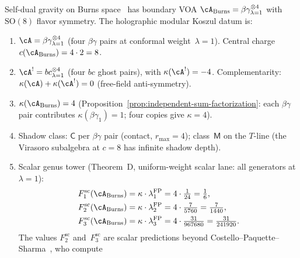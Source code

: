 \begin{computation}

\label{comp:burns-space-holographic-datum}
Self-dual gravity on Burns space~\cite{CPS2208,CPS2306} has boundary
VOA $\cA_{\mathrm{Burns}} = \beta\gamma^{\otimes 4}_{\lambda=1}$
with $\mathrm{SO}(8)$ flavor symmetry.
The holographic modular Koszul datum is:
\begin{enumerate}[label=\textup{(\roman*)}]
\item $\cA = \beta\gamma^{\otimes 4}_{\lambda=1}$
 \textup{(}four $\beta\gamma$ pairs at conformal
 weight~$\lambda = 1$\textup{)}.
 Central charge
 $c(\cA_{\mathrm{Burns}}) = 4 \cdot 2 = 8$.
\item $\cA^! = bc^{\otimes 4}_{\lambda=1}$
 \textup{(}four $bc$ ghost pairs\textup{)},
 with $\kappa(\cA^!) = -4$.
 Complementarity:
 $\kappa(\cA) + \kappa(\cA^!) = 0$
 \textup{(}free-field anti-symmetry\textup{)}.
\item $\kappa(\cA_{\mathrm{Burns}}) = 4$
 \textup{(}Proposition~\textup{\ref{prop:independent-sum-factorization}}:
 each $\beta\gamma$ pair contributes
 $\kappa(\beta\gamma_1) = 1$; four copies give
 $\kappa = 4$\textup{)}.
\item Shadow class: $\mathsf{C}$ per $\beta\gamma$ pair
 \textup{(}contact, $r_{\max} = 4$\textup{)};
 class~$\mathsf{M}$ on the $T$-line
 \textup{(}the Virasoro subalgebra at $c = 8$ has infinite
 shadow depth\textup{)}.
\item Scalar genus tower \textup{(}Theorem~D,
 uniform-weight scalar lane: all generators at
 $\lambda = 1$\textup{)}:
 \begin{align}
 F_1^{\mathrm{sc}}(\cA_{\mathrm{Burns}})
 &= \kappa \cdot \lambda_1^{\mathrm{FP}}
 = 4 \cdot \tfrac{1}{24}
 = \tfrac{1}{6},
 \label{eq:burns-F1} \\
 F_2^{\mathrm{sc}}(\cA_{\mathrm{Burns}})
 &= \kappa \cdot \lambda_2^{\mathrm{FP}}
 = 4 \cdot \tfrac{7}{5760}
 = \tfrac{7}{1440},
 \label{eq:burns-F2} \\
 F_3^{\mathrm{sc}}(\cA_{\mathrm{Burns}})
 &= \kappa \cdot \lambda_3^{\mathrm{FP}}
 = 4 \cdot \tfrac{31}{967680}
 = \tfrac{31}{241920}.
 \label{eq:burns-F3}
 \end{align}
 The values $F_2^{\mathrm{sc}}$ and~$F_3^{\mathrm{sc}}$ are scalar
 predictions beyond
 Costello--Paquette--Sharma~\cite{CPS2306}, who compute

\end{enumerate}
\end{computation}
